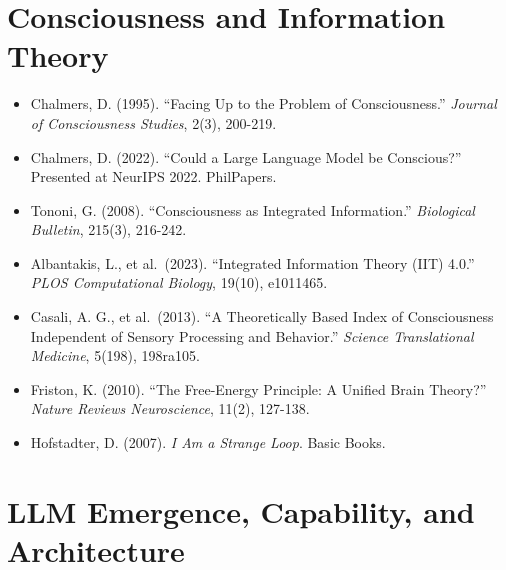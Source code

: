 \documentclass[12pt]{article}
\providecommand{\tightlist}{\setlength{\itemsep}{0pt}\setlength{\parskip}{0pt}}
\begin{document}
\section{Consciousness and Information
Theory}\label{consciousness-and-information-theory}

\begin{itemize}
\tightlist
\item
  Chalmers, D. (1995). ``Facing Up to the Problem of Consciousness.''
  \emph{Journal of Consciousness Studies}, 2(3), 200-219.
\item
  Chalmers, D. (2022). ``Could a Large Language Model be Conscious?''
  Presented at NeurIPS 2022. PhilPapers.
\item
  Tononi, G. (2008). ``Consciousness as Integrated Information.''
  \emph{Biological Bulletin}, 215(3), 216-242.
\item
  Albantakis, L., et al.~(2023). ``Integrated Information Theory (IIT)
  4.0.'' \emph{PLOS Computational Biology}, 19(10), e1011465.
\item
  Casali, A. G., et al.~(2013). ``A Theoretically Based Index of
  Consciousness Independent of Sensory Processing and Behavior.''
  \emph{Science Translational Medicine}, 5(198), 198ra105.
\item
  Friston, K. (2010). ``The Free-Energy Principle: A Unified Brain
  Theory?'' \emph{Nature Reviews Neuroscience}, 11(2), 127-138.
\item
  Hofstadter, D. (2007). \emph{I Am a Strange Loop}. Basic Books.
\end{itemize}

\section{LLM Emergence, Capability, and
Architecture}\label{llm-emergence-capability-and-architecture}
\end{document}
